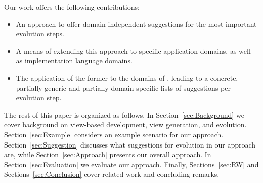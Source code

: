 Our work offers the following contributions:
\begin{itemize}
    \item An approach to offer domain-independent suggestions for the most important \metamodel evolution steps.
    \item A means of extending this approach to specific application domains, as well as implementation language domains.
    \item The application of the former to the domains of , leading to a concrete, partially generic and partially domain-specific lists of suggestions per \metamodel evolution step.
\end{itemize}

The rest of this paper is organized as follows. In Section~\ref{sec:Background} we cover background on view-based development, view generation, and \metamodel evolution. Section~\ref{sec:Example} considers an example scenario for our approach. Section~\ref{sec:Suggestion} discusses what suggestions for evolution in our approach are, while Section~\ref{sec:Approach} presents our overall approach. %
In Section~\ref{sec:Evaluation} we evaluate our approach. Finally, Sections~\ref{sec:RW} and Sections~\ref{sec:Conclusion} cover related work and concluding remarks.
